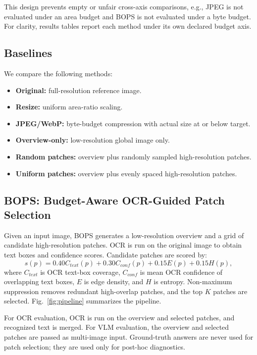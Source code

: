 \documentclass[conference]{IEEEtran}
\newcommand{\method}{BOPS}
\begin{document}
This design prevents empty or unfair cross-axis comparisons, e.g., JPEG is not evaluated under an area budget and BOPS is not evaluated under a byte budget. For clarity, results tables report each method under its own declared budget axis.

\subsection{Baselines}
We compare the following methods:
\begin{itemize}[leftmargin=*]
    \item \textbf{Original:} full-resolution reference image.
    \item \textbf{Resize:} uniform area-ratio scaling.
    \item \textbf{JPEG/WebP:} byte-budget compression with actual size at or below target.
    \item \textbf{Overview-only:} low-resolution global image only.
    \item \textbf{Random patches:} overview plus randomly sampled high-resolution patches.
    \item \textbf{Uniform patches:} overview plus evenly spaced high-resolution patches.
\end{itemize}

\subsection{BOPS: Budget-Aware OCR-Guided Patch Selection}
Given an input image, \method{} generates a low-resolution overview and a grid of candidate high-resolution patches. OCR is run on the original image to obtain text boxes and confidence scores. Candidate patches are scored by:
\begin{equation}
    s(p) = 0.40C_{text}(p) + 0.30C_{conf}(p) + 0.15E(p) + 0.15H(p),
\end{equation}
where $C_{text}$ is OCR text-box coverage, $C_{conf}$ is mean OCR confidence of overlapping text boxes, $E$ is edge density, and $H$ is entropy. Non-maximum suppression removes redundant high-overlap patches, and the top $K$ patches are selected. Fig.~\ref{fig:pipeline} summarizes the pipeline.

For OCR evaluation, OCR is run on the overview and selected patches, and recognized text is merged. For VLM evaluation, the overview and selected patches are passed as multi-image input. Ground-truth answers are never used for patch selection; they are used only for post-hoc diagnostics.
\end{document}
